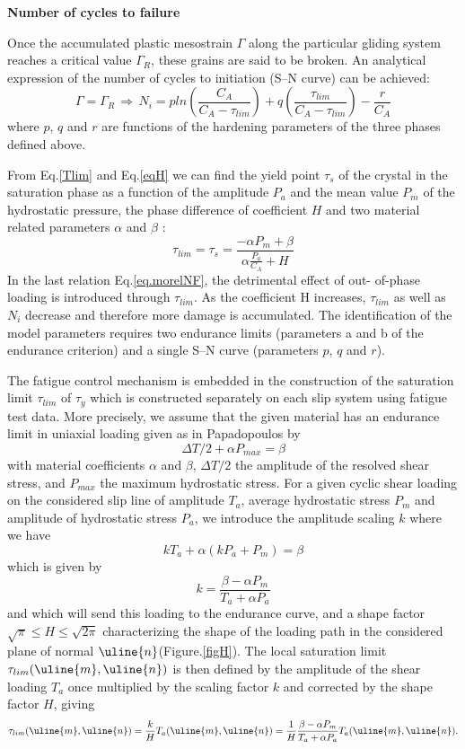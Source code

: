 \textbf{Number of cycles to failure}

Once the accumulated plastic mesostrain $\Gamma$ along the particular gliding system reaches a critical value $\Gamma_R$, these grains are said to be broken. An analytical expression of the number
of cycles to initiation (S–N curve) can be achieved:
\begin{equation}
\Gamma=\Gamma_R \, \Rightarrow \, N_i=pln\left(\frac{C_A}{C_A-\tau_{lim}}\right)+q\left(\frac{\tau_{lim}}{C_A-\tau_{lim}}\right)-\frac{r}{C_A}
\label{eq.morelNF}
\end{equation}
where $p$, $q$ and $r$ are functions of the hardening parameters of the three phases defined above.

From Eq.\eqref{Tlim} and Eq.\eqref{eqH} we can find the yield point $\tau_s$ of the crystal in the saturation phase as a function of the amplitude $P_a$ and the mean value $P_m$ of the hydrostatic pressure, the phase difference of coefficient $H$ and two material related parameters $\alpha$ and $\beta$ :
\begin{equation}
\tau_{lim}=\tau_s=\frac{-\alpha P_m+\beta}{\alpha\frac{P_a}{C_A}+H}
\label{taus}
\end{equation}
In the last relation Eq.\ref{eq.morelNF}, the detrimental effect of out-
of-phase loading is introduced through $\tau_{lim}$. As the coefficient H increases, $\tau_{lim}$ as well as $N_i$ decrease and therefore more damage is accumulated. The identification of
the model parameters requires two endurance limits
(parameters a and b of the endurance criterion) and a
single S–N curve (parameters $p$, $q$ and $r$).

The fatigue control mechanism is embedded in the construction of the saturation limit $\tau_{lim}$ of $\tau_y$ which is constructed separately on each slip system using fatigue test data. More precisely, we assume that the given material has an endurance limit in uniaxial loading given as in Papadopoulos by
$$\Delta T/2+\alpha P_{max}=\beta$$
with material coefficients $\alpha$ and $\beta$, $\Delta T/2$ the amplitude of the resolved shear stress, and $P_{max}$ the maximum hydrostatic stress. For a given cyclic shear loading on the considered slip line of amplitude $T_a$, average hydrostatic stress $P_m$ and amplitude of hydrostatic stress $P_a$, we introduce the amplitude scaling $k$ where we have
$$kT_a+\alpha\left( kP_a+P_m\right)=\beta  $$
which is given by
 $$ k=\dfrac{\beta-\alpha P_m}{T_a+\alpha P_a}$$ 
 and which will send this loading to the endurance curve, and a shape factor $\sqrt{\pi}\leqslant H\leqslant \sqrt{2\pi}$ characterizing the shape of the loading path in the considered plane of normal $\uline{n}$(Figure.\ref{figH}). The local saturation limit $\tau_{lim}(\uline{m},\uline{n})$ is then defined by the amplitude of the shear loading $T_a$ once multiplied by the scaling factor $k$ and corrected by the shape factor $H$, giving
$$\tau_{lim}(\uline{m},\uline{n})=\frac{k}{H}T_a(\uline{m},\uline{n})=\frac{1}{H}\frac{\beta-\alpha P_m}{T_a+\alpha P_a}T_a(\uline{m},\uline{n}).$$

